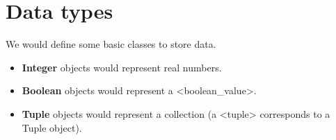 \documentclass{eplDoc}
\begin{document}
\section{Data types}

We would define some basic classes to store data. 

\begin{itemize}
	\item \textbf{Integer} objects would represent real numbers. 
	\item \textbf{Boolean} objects would represent a <boolean\_value>.
	\item \textbf{Tuple} objects would represent a collection (a <tuple> corresponds to a Tuple object).
\end{itemize}
\end{document}
